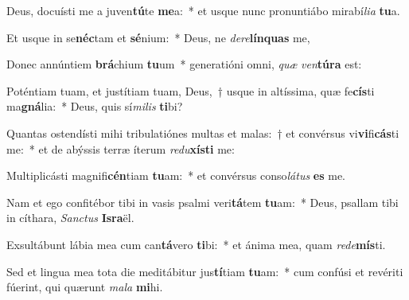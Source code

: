 \item Deus, docuísti me a juven\textbf{tú}te \textbf{me}a:~* et usque nunc pronuntiábo mirabí\textit{li}\textit{a} \textbf{tu}a.
\item Et usque in se\textbf{néc}tam et \textbf{sé}nium:~* Deus, ne \textit{de}\textit{re}\textbf{lín}\textbf{quas} me,
\item Donec annúntiem \textbf{brá}chium \textbf{tu}um~* generatióni omni, \textit{quæ} \textit{ven}\textbf{tú}\textbf{ra} est:
\item Poténtiam tuam, et justítiam tuam, Deus,~† usque in altíssima, quæ fe\textbf{cís}ti ma\textbf{gná}lia:~* Deus, quis sí\textit{mi}\textit{lis} \textbf{ti}bi?
\item Quantas ostendísti mihi tribulatiónes multas et malas:~† et convérsus vi\textbf{vi}fi\textbf{cás}ti me:~* et de abýssis terræ íterum \textit{re}\textit{du}\textbf{xís}\textbf{ti} me:
\item Multiplicásti magnifi\textbf{cén}tiam \textbf{tu}am:~* et convérsus conso\textit{lá}\textit{tus} \textbf{es} me.
\item Nam et ego confitébor tibi in vasis psalmi veri\textbf{tá}tem \textbf{tu}am:~* Deus, psallam tibi in cíthara, \textit{Sanc}\textit{tus} \textbf{Is}\textbf{ra}ël.
\item Exsultábunt lábia mea cum can\textbf{tá}vero \textbf{ti}bi:~* et ánima mea, quam \textit{red}\textit{e}\textbf{mís}ti.
\item Sed et lingua mea tota die meditábitur jus\textbf{tí}tiam \textbf{tu}am:~* cum confúsi et revériti fúerint, qui quærunt \textit{ma}\textit{la} \textbf{mi}hi.
